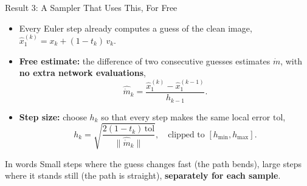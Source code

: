 \documentclass[aspectratio=169]{beamer}
\newcommand{\hl}[1]{\textcolor{coolpurple}{\textbf{#1}}}
\begin{document}
	\begin{frame}{Result 3: A Sampler That Uses This, For Free}
		\small
		\begin{itemize}
			\item Every Euler step already computes a guess of the clean image, $\hat x_1^{(k)} = x_k + (1 - t_k)\,v_k$.
			\item \hl{Free estimate:} the difference of two consecutive guesses estimates $\dot m$, with \hl{no extra network evaluations},
			$$ \widehat{\dot m}_k = \frac{\hat x_1^{(k)} - \hat x_1^{(k - 1)}}{h_{k - 1}}. $$
			\item \hl{Step size:} choose $h_k$ so that every step makes the same local error $\mathrm{tol}$,
			$$ h_k = \sqrt{\frac{2(1 - t_k)\,\mathrm{tol}}{\|\widehat{\dot m}_k\|}}, \quad \text{clipped to } [h_{\min}, h_{\max}]. $$
		\end{itemize}
		\begin{block}{In words}
			\footnotesize Small steps where the guess changes fast (the path bends), large steps where it stands still (the path is straight), \hl{separately for each sample}.
		\end{block}
	\end{frame}
\end{document}
